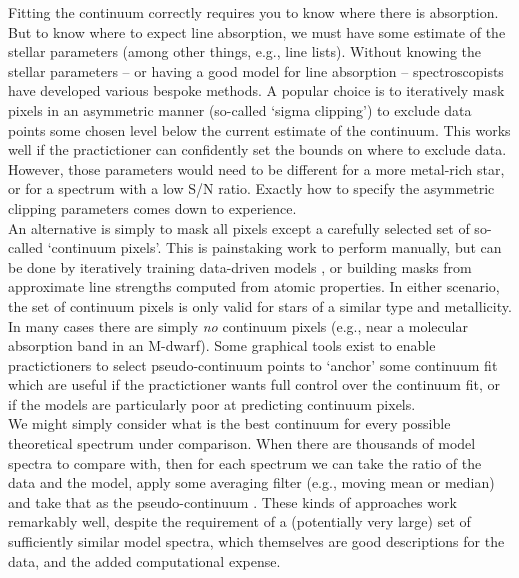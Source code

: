 \documentclass[modern,linenumbers]{aastex631}
\begin{document}
Fitting the continuum correctly requires you to know where there is absorption. But to know where to expect line absorption, we must have some estimate of the stellar parameters (among other things, e.g., line lists). Without knowing the stellar parameters -- or having a good model for line absorption -- spectroscopists have developed various bespoke methods. A popular choice is to iteratively mask pixels in an asymmetric manner (so-called `sigma clipping') to exclude data points some chosen level below the current estimate of the continuum. This works well if the practictioner can confidently set the bounds on where to exclude data. However, those parameters would need to be different for a more metal-rich star, or for a spectrum with a low S/N ratio. Exactly how to specify the asymmetric clipping parameters comes down to experience.\\

An alternative is simply to mask all pixels except a carefully selected set of so-called `continuum pixels'. This is painstaking work to perform manually, but can be done by iteratively training data-driven models \citep{Ness:2015}, or building masks from approximate line strengths computed from atomic properties. In either scenario, the set of continuum pixels is only valid for stars of a similar type and metallicity. In many cases there are simply \emph{no} continuum pixels (e.g., near a molecular absorption band in an M-dwarf). Some graphical tools exist to enable practictioners to select pseudo-continuum points to `anchor' some continuum fit \citep{Xu:2019,Cretignier:2020} which are useful if the practictioner wants full control over the continuum fit, or if the models are particularly poor at predicting continuum pixels.\\

We might simply consider what is the best continuum for every possible theoretical spectrum under comparison. When there are thousands of model spectra to compare with, then for each spectrum we can take the ratio of the data and the model, apply some averaging filter (e.g., moving mean or median) and take that as the pseudo-continuum \citep[e.g.,][]{aspcap}. These kinds of approaches work remarkably well, despite the requirement of a (potentially very large) set of sufficiently similar model spectra, which themselves are good descriptions for the data, and the added computational expense.\\
\end{document}
